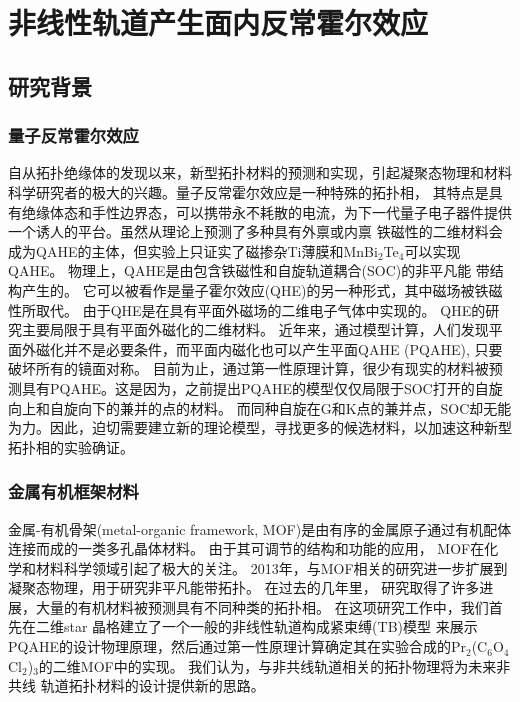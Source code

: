 
\chapter{非线性轨道产生面内反常霍尔效应}

\section{研究背景}

\subsection{量子反常霍尔效应}


自从拓扑绝缘体的发现以来\cite{PQAHE1}，新型拓扑材料的预测和实现，引起凝聚态物理和材料科学研究者的极大的兴趣\cite{PQAHE2,PQAHE3,PQAHE4,PQAHE5,PQAHE6}。量子反常霍尔效应是一种特殊的拓扑相，
其特点是具有绝缘体态和手性边界态\cite{PQAHE7}，可以携带永不耗散的电流，为下一代量子电子器件提供一个诱人的平台。虽然从理论上预测了多种具有外禀或内禀
铁磁性的二维材料会成为QAHE的主体\cite{PQAHE8,PQAHE9}，但实验上只证实了磁掺杂Ti薄膜和MnBi$_2$Te$_4$可以实现QAHE\cite{PQAHE10,PQAHE11,PQAHE12,PQAHE13}。 物理上，QAHE是由包含铁磁性和自旋轨道耦合(SOC)的非平凡能
带结构产生的\cite{PQAHE7,PQAHE14,PQAHE15}。 它可以被看作是量子霍尔效应(QHE)的另一种形式，其中磁场被铁磁性所取代。 由于QHE是在具有平面外磁场的二维电子气体中实现的。 
QHE的研究主要局限于具有平面外磁化的二维材料\cite{PQAHE8,PQAHE9}。 近年来，通过模型计算，人们发现平面外磁化并不是必要条件，而平面内磁化也可以产生平面QAHE (PQAHE),
只要破坏所有的镜面对称\cite{PQAHE17,PQAHE18,PQAHE19}。 
目前为止，通过第一性原理计算，很少有现实的材料被预测具有PQAHE\cite{PQAHE20}。这是因为，之前提出PQAHE的模型仅仅局限于SOC打开的自旋向上和自旋向下的兼并的点的材料\cite{PQAHE17,PQAHE18,PQAHE19}。
而同种自旋在G和K点的兼并点，SOC却无能为力。因此，迫切需要建立新的理论模型，寻找更多的候选材料，以加速这种新型拓扑相的实验确证。 


\subsection{金属有机框架材料}

金属-有机骨架(metal-organic framework, MOF)是由有序的金属原子通过有机配体连接而成的一类多孔晶体材料\cite{PQAHE21}。 由于其可调节的结构和功能的应用，
MOF在化学和材料科学领域引起了极大的关注\cite{PQAHE22}。 2013年，与MOF相关的研究进一步扩展到凝聚态物理，用于研究非平凡能带拓扑\cite{PQAHE23,PQAHE23,PQAHE24,PQAHE25}。 在过去的几年里，
研究取得了许多进展，大量的有机材料被预测具有不同种类的拓扑相\cite{PQAHE26,PQAHE27,PQAHE28,PQAHE29,PQAHE30,PQAHE31,PQAHE32,PQAHE33,PQAHE34,PQAHE35,PQAHE36}。 在这项研究工作中，我们首先在二维star 晶格建立了一个一般的非线性轨道构成紧束缚(TB)模型
来展示PQAHE的设计物理原理，然后通过第一性原理计算确定其在实验合成的Pr$_2$(C$_6$O$_4$Cl$_{2}$)$_3$的二维MOF中的实现。 我们认为，与非共线轨道相关的拓扑物理将为未来非共线
轨道拓扑材料的设计提供新的思路。

